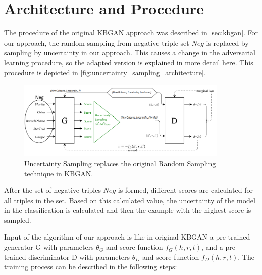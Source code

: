 
\section{Architecture and Procedure} 
\label{sec:architecture_and_procedure}

The procedure of the original KBGAN approach was described in \autoref{sec:kbgan}.
For our approach, the random sampling from negative triple set $Neg$ is replaced by sampling by uncertainty in our approach.
This causes a change in the adversarial learning procedure, so the adapted version is explained in more detail here.
This procedure is depicted in \autoref{fig:uncertainty_sampling_architecture}.
\begin{figure}[t]
  \centering
    \includegraphics[width=0.90\textwidth]{figures/architecture.png}
  \caption{Uncertainty Sampling replaces the original Random Sampling technique in \ac{KBGAN}.}
  \label{fig:uncertainty_sampling_architecture}
\end{figure}

After the set of negative triples $Neg$ is formed, different scores are calculated for all triples in the set.
Based on this calculated value, the uncertainty of the model in the classification is calculated and then the example with the highest score is sampled. 

Input of the algorithm of our approach is like in original \ac{KBGAN} a pre-trained generator G with parameters $\theta_G$ and score function $f_G(h,r,t)$, 
and a pre-trained discriminator D with parameters $\theta_D$ and score function $f_D(h,r,t)$.
The training process can be described in the following steps:

